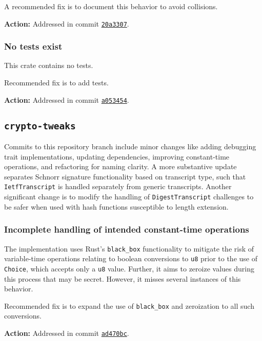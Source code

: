 \documentclass{article}
\begin{document}
A recommended fix is to document this behavior to avoid collisions.

\textbf{Action:} Addressed in commit \href{https://github.com/serai-dex/serai/commit/20a33079f8a6d3b6f69a9221432844406440f21b}{\texttt{20a3307}}.


\subsubsection{No tests exist}

This crate contains no tests.

Recommended fix is to add tests.

\textbf{Action:} Addressed in commit \href{https://github.com/serai-dex/serai/commit/a053454ae4135cad006dc38afdac008412300a81}{\texttt{a053454}}.


\subsection{\texttt{crypto-tweaks}}

Commits to this repository branch include minor changes like adding debugging trait implementations, updating dependencies, improving constant-time operations, and refactoring for naming clarity.
A more substantive update separates Schnorr signature functionality based on transcript type, such that \texttt{IetfTranscript} is handled separately from generic transcripts.
Another significant change is to modify the handling of \texttt{DigestTranscript} challenges to be safer when used with hash functions susceptible to length extension.


\subsubsection{Incomplete handling of intended constant-time operations}

The implementation uses Rust's \texttt{black\_box} functionality to mitigate the risk of variable-time operations relating to boolean conversions to \texttt{u8} prior to the use of \texttt{Choice}, which accepts only a \texttt{u8} value.
Further, it aims to zeroize values during this process that may be secret.
However, it misses several instances of this behavior.

Recommended fix is to expand the use of \texttt{black\_box} and zeroization to all such conversions.

\textbf{Action:} Addressed in commit \href{https://github.com/serai-dex/serai/commit/ad470bc969c58e30192e2bcd020b970b90cab60a}{\texttt{ad470bc}}.
\end{document}
